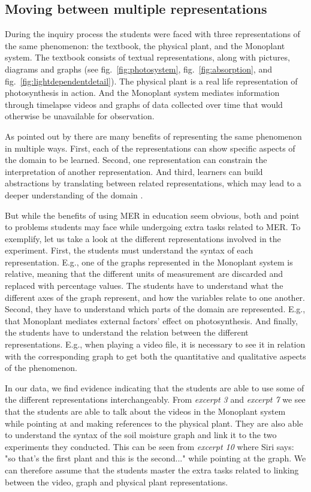 \subsection{Moving between multiple representations}
During the inquiry process the students were faced with three representations of the same phenomenon: the textbook, the physical plant, and the Monoplant system. The textbook consists of textual representations, along with pictures, diagrams and graphs (see fig.~\ref{fig:photosystem}, fig.~\ref{fig:absorption}, and fig.~\ref{fig:lightdependentdetail}). The physical plant is a real life representation of photosynthesis in action. And the Monoplant system mediates information through timelapse videos and graphs of data collected over time that would otherwise be unavailable for observation.  

As pointed out by \citet{van2006supporting} there are many benefits of representing the same phenomenon in multiple ways. First, each of the representations can show specific aspects of the domain to be learned. Second, one representation can constrain the interpretation of another representation. And third, learners can build abstractions by translating between related representations, which may lead to a deeper understanding of the domain \citep{ainsworth1999functions}. 

But while the benefits of using MER in education seem obvious, both \citet{ainsworth1999functions} and \citet{van2006supporting} point to problems students may face while undergoing extra tasks related to MER. To exemplify, let us take a look at the different representations involved in the experiment. First, the students must understand the syntax of each representation. E.g., one of the graphs represented in the Monoplant system is relative, meaning that the different units of measurement are discarded and replaced with percentage values. The students have to understand what the different axes of the graph represent, and how the variables relate to one another. Second, they have to understand which parts of the domain are represented. E.g., that Monoplant mediates external factors' effect on photosynthesis. And finally, the students have to understand the relation between the different representations. E.g., when playing a video file, it is necessary to see it in relation with the corresponding graph to get both the quantitative and qualitative aspects of the phenomenon.

In our data, we find evidence indicating that the students are able to use some of the different representations interchangeably. From \emph{excerpt 3} and \emph{excerpt 7} we see that the students are able to talk about the videos in the Monoplant system while pointing at and making references to the physical plant. They are also able to understand the syntax of the soil moisture graph and link it to the two experiments they conducted. This can be seen from \emph{excerpt 10} where Siri says: "so that's the first plant and this is the second..." while pointing at the graph. We can therefore assume that the students master the extra tasks related to linking between the video, graph and physical plant representations. 

